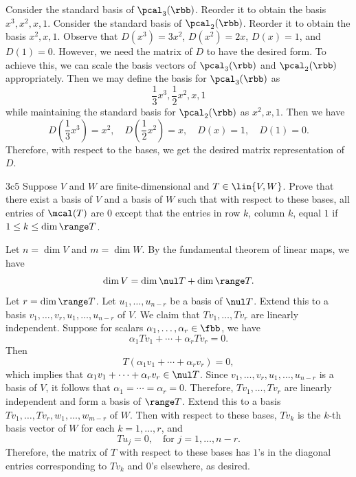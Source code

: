 \begin{sol}
    Consider the standard basis of $\pcal_3(\rbb)$.
	Reorder it to obtain the basis $x^3, x^2, x, 1$.
	Consider the standard basis of $\pcal_2(\rbb)$.
	Reorder it to obtain the basis $x^2, x, 1$.
	Observe that $D(x^3) = 3x^2$, $D(x^2) = 2x$, $D(x) = 1$, and $D(1) = 0$.
	However, we need the matrix of $D$ to have the desired form.
	To achieve this, we can scale the basis vectors of $\pcal_3(\rbb)$ and $\pcal_2(\rbb)$ appropriately.
	Then we may define the basis for $\pcal_3(\rbb)$ as
    \[
    	\frac 13 x^3, \frac 12 x^2, x, 1
    \]
    while maintaining the standard basis for $\pcal_2(\rbb)$ as $x^2, x, 1$.
	Then we have
    \[
    	D\left(\frac 13 x^3\right) = x^2, \quad D\left(\frac 12 x^2\right) = x, \quad D(x) = 1, \quad D(1) = 0.
    \]
    Therefore, with respect to the bases, we get the desired matrix representation of $D$.
\end{sol}

\begin{exercise}{3c5}
    Suppose $V$ and $W$ are finite-dimensional and $T \in \lin{V, W}$.
	Prove that there exist a basis of $V$ and a basis of $W$ such that with respect to these bases, all entries of $\mcal(T)$ are $0$ except that the entries in row $k$, column $k$, equal $1$ if $1 \leq k \leq \dim \range T$.
\end{exercise}

\begin{sol}
    Let $n = \dim V$ and $m = \dim W$.
	By the fundamental theorem of linear maps, we have
    \[
    	\dim V = \dim \nul T + \dim \range T.
    \]
    Let $r = \dim \range T$.
	Let $u_1, \ldots, u_{n - r}$ be a basis of $\nul T$.
	Extend this to a basis $v_1, \ldots, v_r, u_1, \ldots, u_{n - r}$ of $V$.
	We claim that $Tv_1, \ldots, Tv_r$ are linearly independent.
	Suppose for scalars $\alpha_1, \ldots, \alpha_r \in \fbb$, we have
    \[
    	\alpha_1 Tv_1 + \cdots + \alpha_r Tv_r = 0.
    \]
    Then
    \[
    	T(\alpha_1 v_1 + \cdots + \alpha_r v_r) = 0,
    \]
    which implies that $\alpha_1 v_1 + \cdots + \alpha_r v_r \in \nul T$.
	Since $v_1, \ldots, v_r, u_1, \ldots, u_{n - r}$ is a basis of $V$, it follows that $\alpha_1 = \cdots = \alpha_r = 0$.
	Therefore, $Tv_1, \ldots, Tv_r$ are linearly independent and form a basis of $\range T$.
	Extend this to a basis $Tv_1, \ldots, Tv_r, w_1, \ldots, w_{m - r}$ of $W$.
	Then with respect to these bases, $Tv_k$ is the $k$-th basis vector of $W$ for each $k = 1, \ldots, r$, and
    \[
    	Tu_j = 0, \quad \text{for } j = 1, \ldots, n - r.
    \]
    Therefore, the matrix of $T$ with respect to these bases has $1$'s in the diagonal entries corresponding to $Tv_k$ and $0$'s elsewhere, as desired.
\end{sol}

